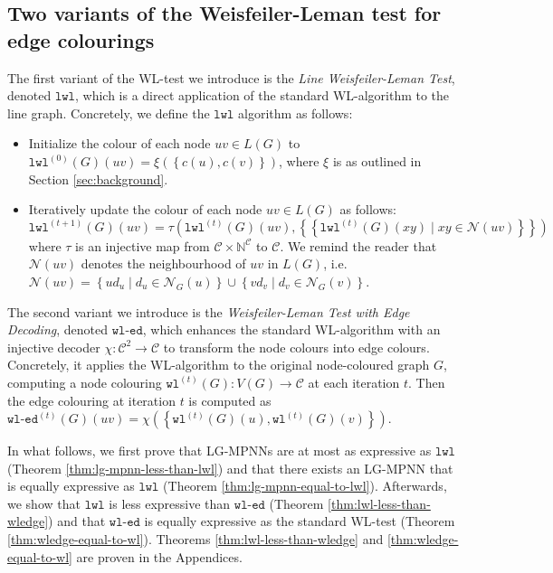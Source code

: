 \documentclass{article}
\newcommand{\set}[1]{\left\{#1\right\}}
\newcommand{\multiset}[1]{\left\{\!\!\left\{#1\right\}\!\!\right\}}
\newcommand{\iter}[1]{^{(#1)}}
\newcommand{\wl}{\texttt{wl}}
\newcommand{\wledge}{\texttt{wl-ed}}
\newcommand{\lwl}{\texttt{lwl}}
\newcommand{\dec}{\chi}
\newcommand{\initdec}{\xi}
\newcommand{\hash}{\tau}
\newcommand{\nbh}{\mathcal{N}}
\newcommand{\mcc}{\mathcal{C}}
\newcommand{\mbn}{\mathbb{N}}
\begin{document}
\subsection{Two variants of the Weisfeiler-Leman test for edge colourings}   \label{ssec:wl-variations}

The first variant of the WL-test we introduce is the \emph{Line Weisfeiler-Leman Test}, denoted $\lwl$, which is a direct application of the standard WL-algorithm to the line graph. Concretely, we define the $\lwl$ algorithm as follows:
\begin{itemize}
    \item Initialize the colour of each node $uv \in L(G)$ to $\lwl\iter{0}(G)(uv) = \initdec(\set{c(u),c(v)})$, where $\initdec$ is as outlined in Section \ref{sec:background}.
    \item Iteratively update the colour of each node $uv \in L(G)$ as follows:
    \begin{equation}
        \lwl\iter{t+1}(G)(uv) = \hash\left(\lwl\iter{t}(G)(uv), \multiset{\lwl\iter{t}(G)(xy) \mid xy \in \nbh(uv)}\right)
    \end{equation}
    where $\hash$ is an injective map from $\mcc\times\mbn^\mcc$ to $\mcc$. We remind the reader that $\nbh(uv)$ denotes the neighbourhood of $uv$ in $L(G)$, i.e. $\nbh(uv) = \set{ud_u \mid d_u \in \nbh_G(u)} \cup \set{vd_v \mid d_v \in \nbh_G(v)}$.
\end{itemize}
The second variant we introduce is the \emph{Weisfeiler-Leman Test with Edge Decoding}, denoted $\wledge$, which enhances the standard WL-algorithm with an injective decoder $\dec: \mcc^2\rightarrow\mcc$ to transform the node colours into edge colours. 
Concretely, it applies the WL-algorithm to the original node-coloured graph $G$, computing a node colouring $\wl\iter{t}(G): V(G) \rightarrow \mcc$ at each iteration $t$. Then the edge colouring at iteration $t$ is computed as $\wledge\iter{t}(G)(uv) = \dec(\set{\wl\iter{t}(G)(u),\wl\iter{t}(G)(v)})$.


In what follows, we first prove that LG-MPNNs are at most as expressive as $\lwl$ (Theorem \ref{thm:lg-mpnn-less-than-lwl}) and that there exists an LG-MPNN that is equally expressive as $\lwl$ (Theorem \ref{thm:lg-mpnn-equal-to-lwl}).
Afterwards, we show that $\lwl$ is less expressive than $\wledge$ (Theorem \ref{thm:lwl-less-than-wledge}) and that $\wledge$ is equally expressive as the standard WL-test (Theorem \ref{thm:wledge-equal-to-wl}). Theorems \ref{thm:lwl-less-than-wledge} and \ref{thm:wledge-equal-to-wl} are proven in the Appendices.
\end{document}
